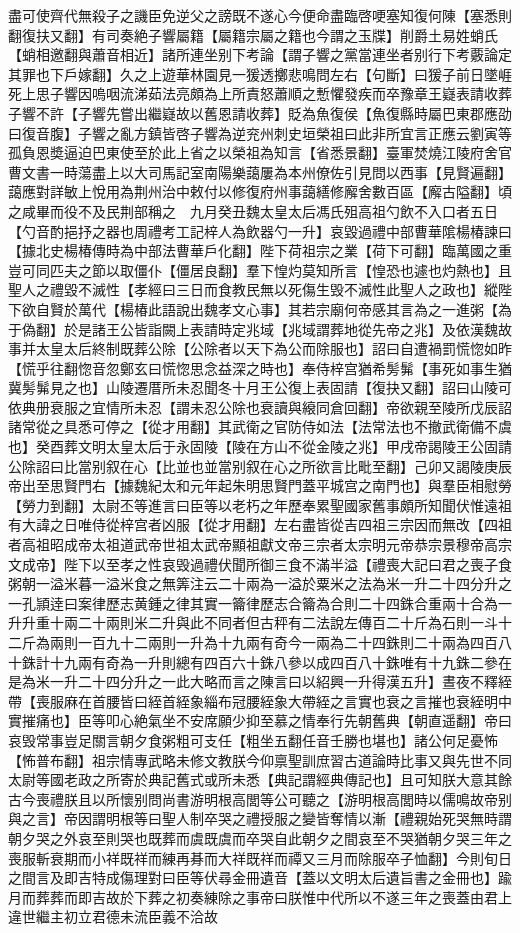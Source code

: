 盡可使齊代無殺子之譏臣免逆父之謗既不遂心今便命盡臨啓哽塞知復何陳【塞悉則翻復扶又翻】有司奏絶子響屬籍【屬籍宗屬之籍也今謂之玉牒】削爵土易姓蛸氏【蛸相邀翻與蕭音相近】諸所連坐别下考論【謂子響之黨當連坐者别行下考覈論定其罪也下戶嫁翻】久之上遊華林園見一猨透擲悲鳴問左右【句斷】曰猨子前日墜崕死上思子響因嗚咽流涕茹法亮頗為上所責怒蕭順之慙懼發疾而卒豫章王嶷表請收葬子響不許【子響先嘗出繼嶷故以舊恩請收葬】貶為魚復侯【魚復縣時屬巴東郡應劭曰復音腹】子響之亂方鎮皆啓子響為逆兖州刺史垣榮祖曰此非所宜言正應云劉寅等孤負恩奬逼迫巴東使至於此上省之以榮祖為知言【省悉景翻】臺軍焚燒江陵府舍官曹文書一時蕩盡上以大司馬記室南陽樂藹屢為本州僚佐引見問以西事【見賢遍翻】藹應對詳敏上悅用為荆州治中敕付以修復府州事藹繕修廨舍數百區【廨古隘翻】頃之咸畢而役不及民荆部稱之　九月癸丑魏太皇太后馮氏殂高祖勺飲不入口者五日【勺音酌挹抒之器也周禮考工記梓人為飲器勺一升】哀毀過禮中部曹華隂楊椿諫曰【據北史楊椿傳時為中部法曹華戶化翻】陛下荷祖宗之業【荷下可翻】臨萬國之重豈可同匹夫之節以取僵仆【僵居良翻】羣下惶灼莫知所言【惶恐也遽也灼熱也】且聖人之禮毀不滅性【孝經曰三日而食教民無以死傷生毁不滅性此聖人之政也】縱陛下欲自賢於萬代【楊椿此語說出魏孝文心事】其若宗廟何帝感其言為之一進粥【為于偽翻】於是諸王公皆詣闕上表請時定兆域【兆域謂葬地從先帝之兆】及依漢魏故事并太皇太后終制既葬公除【公除者以天下為公而除服也】詔曰自遭禍罰慌惚如昨【慌乎往翻惚音忽鄭玄曰慌惚思念益深之時也】奉侍梓宫猶希髣髴【事死如事生猶冀髣髴見之也】山陵遷厝所未忍聞冬十月王公復上表固請【復抉又翻】詔曰山陵可依典册衰服之宜情所未忍【謂未忍公除也衰讀與縗同倉回翻】帝欲親至陵所戊辰詔諸常從之具悉可停之【從才用翻】其武衛之官防侍如法【法常法也不撤武衛備不虞也】癸酉葬文明太皇太后于永固陵【陵在方山不從金陵之兆】甲戌帝謁陵王公固請公除詔曰比當别叙在心【比並也並當别叙在心之所欲言比毗至翻】己卯又謁陵庚辰帝出至思賢門右【據魏紀太和元年起朱明思賢門蓋平城宫之南門也】與羣臣相慰勞【勞力到翻】太尉丕等進言曰臣等以老朽之年歷奉累聖國家舊事頗所知聞伏惟遠祖有大諱之日唯侍從梓宫者凶服【從才用翻】左右盡皆從吉四祖三宗因而無改【四祖者高祖昭成帝太祖道武帝世祖太武帝顯祖獻文帝三宗者太宗明元帝恭宗景穆帝高宗文成帝】陛下以至孝之性哀毁過禮伏聞所御三食不滿半溢【禮喪大記曰君之喪子食粥朝一溢米暮一溢米食之無筭注云二十兩為一溢於粟米之法為米一升二十四分升之一孔頴逹曰案律歷志黄鍾之律其實一籥律歷志合籥為合則二十四銖合重兩十合為一升升重十兩二十兩則米二升與此不同者但古秤有二法說左傳百二十斤為石則一斗十二斤為兩則一百九十二兩則一升為十九兩有奇今一兩為二十四銖則二十兩為四百八十銖計十九兩有奇為一升則總有四百六十銖八參以成四百八十銖唯有十九銖二參在是為米一升二十四分升之一此大略而言之陳言曰以紹興一升得漢五升】晝夜不釋絰帶【喪服麻在首腰皆曰絰首絰象緇布冠腰絰象大帶絰之言實也衰之言摧也衰絰明中實摧痛也】臣等叩心絶氣坐不安席願少抑至慕之情奉行先朝舊典【朝直遥翻】帝曰哀毁常事豈足關言朝夕食粥粗可支任【粗坐五翻任音壬勝也堪也】諸公何足憂怖【怖普布翻】祖宗情專武略未修文教朕今仰禀聖訓庶習古道論時比事又與先世不同太尉等國老政之所寄於典記舊式或所未悉【典記謂經典傳記也】且可知朕大意其餘古今喪禮朕且以所懷别問尚書游明根高閭等公可聽之【游明根高閭時以儒鳴故帝别與之言】帝因謂明根等曰聖人制卒哭之禮授服之變皆奪情以漸【禮親始死哭無時謂朝夕哭之外哀至則哭也既葬而虞既虞而卒哭自此朝夕之間哀至不哭猶朝夕哭三年之喪服斬衰期而小祥既祥而練再朞而大祥既祥而禫又三月而除服卒子恤翻】今則旬日之間言及即吉特成傷理對曰臣等伏尋金冊遺音【蓋以文明太后遺旨書之金冊也】踰月而葬葬而即吉故於下葬之初奏練除之事帝曰朕惟中代所以不遂三年之喪蓋由君上違世繼主初立君德未流臣義不洽故